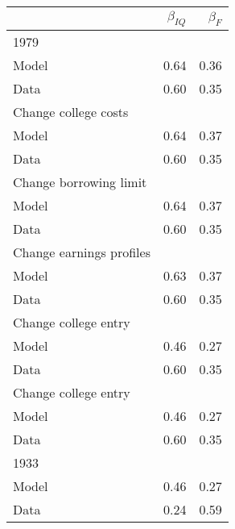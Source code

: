 \begin{tabular}{lrr}
\hline
  & $\beta_{IQ}$  & $\beta_{F}$  \\ 
\hline
1979 &   &   \\ 
Model & 0.64  & 0.36  \\ 
Data & 0.60  & 0.35  \\ 
Change college costs &   &   \\ 
Model & 0.64  & 0.37  \\ 
Data & 0.60  & 0.35  \\ 
Change borrowing limit &   &   \\ 
Model & 0.64  & 0.37  \\ 
Data & 0.60  & 0.35  \\ 
Change earnings profiles &   &   \\ 
Model & 0.63  & 0.37  \\ 
Data & 0.60  & 0.35  \\ 
Change college entry &   &   \\ 
Model & 0.46  & 0.27  \\ 
Data & 0.60  & 0.35  \\ 
Change college entry &   &   \\ 
Model & 0.46  & 0.27  \\ 
Data & 0.60  & 0.35  \\ 
1933 &   &   \\ 
Model & 0.46  & 0.27  \\ 
Data & 0.24  & 0.59  \\ 
\hline
\end{tabular}%
